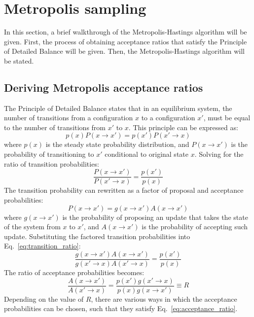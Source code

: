 \documentclass[12pt, two sided]{article}
\begin{document}
\section{Metropolis sampling}

In this section, a brief walkthrough of the Metropolis-Hastings algorithm \cite{doi:10.1063/1.1699114} will be given. First, the process of obtaining acceptance ratios that satisfy the Principle of Detailed Balance will be given. Then, the Metropolis-Hastings algorithm will be stated.

\subsection{Deriving Metropolis acceptance ratios}

The Principle of Detailed Balance states that in an equilibrium system, the number of transitions from a configuration $x$ to a configuration $x'$, must be equal to the number of transitions from $x'$ to $x$. This principle can be expressed as:
%
\begin{equation}
\label{eq:detailed_balance_principle}
p(x)P(x \to x') = p(x') P(x' \to x)
\end{equation}
%
where $p(x)$ is the steady state probability distribution, and $P(x \to x')$ is the probability of transitioning to $x'$ conditional to original state $x$. Solving for the ratio of transition probabilities:
%
\begin{equation}
\label{eq:transition_ratio}
\frac{P(x \to x')}{P(x' \to x)} = \frac{p(x')}{p(x)} 
\end{equation}
%
The transition probability can rewritten as a factor of proposal and acceptance probabilities:
%
\begin{equation}
P(x \to x') = g(x \to x') A(x \to x')
\end{equation}
%
where $g(x \to x')$ is the probability of proposing an update that takes the state of the system from $x$ to $x'$, and $A(x \to x')$ is the probability of accepting such update. Substituting the factored transition probabilities into Eq.~\eqref{eq:transition_ratio}:
%
\begin{equation}
\frac{g(x \to x') A(x \to x')}{ g(x' \to x) A(x' \to x)} = \frac{p(x')}{p(x)} 
\end{equation}
%
The ratio of acceptance probabilities becomes:
%
\begin{equation}
\label{eq:acceptance_ratio}
\frac{A(x \to x')}{A(x' \to x)} = \frac{p(x')g(x' \to x)}{p(x) g(x \to x')} \equiv R
\end{equation}
%
Depending on the value of $R$, there are various ways in which the acceptance probabilities can be chosen, such that they satisfy Eq.~\eqref{eq:acceptance_ratio}.
\end{document}
